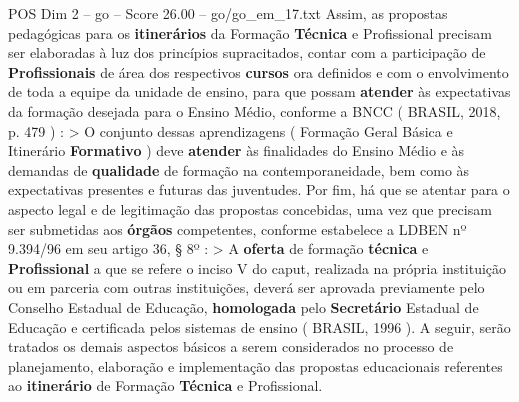 \begin{textsample}{POS Dim 2 – go – Score 26.00 – go/go\_em\_17.txt}
Assim, as propostas pedagógicas para os \textbf{itinerários} da Formação \textbf{Técnica} e Profissional precisam ser elaboradas à luz dos princípios supracitados, contar com a participação de \textbf{Profissionais} de área dos respectivos \textbf{cursos} ora definidos e com o envolvimento de toda a equipe da unidade de ensino, para que possam \textbf{atender} às expectativas da formação desejada para o Ensino Médio, conforme a BNCC ( BRASIL, 2018, p. 479 ) : > O conjunto dessas aprendizagens ( Formação Geral Básica e Itinerário \textbf{Formativo} ) deve \textbf{atender} às finalidades do Ensino Médio e às demandas de \textbf{qualidade} de formação na contemporaneidade, bem como às expectativas presentes e futuras das juventudes.
Por fim, há que se atentar para o aspecto legal e de legitimação das propostas concebidas, uma vez que precisam ser submetidas aos \textbf{órgãos} competentes, conforme estabelece a LDBEN nº 9.394/96 em seu artigo 36, § 8º : > A \textbf{oferta} de formação \textbf{técnica} e \textbf{Profissional} a que se refere o inciso V do caput, realizada na própria instituição ou em parceria com outras instituições, deverá ser aprovada previamente pelo Conselho Estadual de Educação, \textbf{homologada} pelo \textbf{Secretário} Estadual de Educação e certificada pelos sistemas de ensino ( BRASIL, 1996 ).
A seguir, serão tratados os demais aspectos básicos a serem considerados no processo de planejamento, elaboração e implementação das propostas educacionais referentes ao \textbf{itinerário} de Formação \textbf{Técnica} e Profissional.

\end{textsample}
